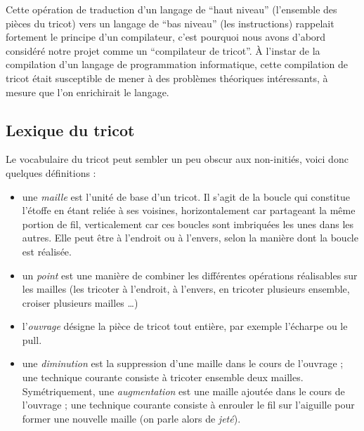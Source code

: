 \documentclass{article}
\begin{document}
Cette opération de traduction d'un langage de ``haut niveau'' (l'ensemble des pièces du tricot) vers un langage de ``bas niveau'' (les instructions) rappelait fortement le principe d'un compilateur, c'est pourquoi 
nous avons d'abord considéré notre projet comme un ``compilateur de tricot''. À l'instar de la compilation d'un langage de programmation informatique, cette 
compilation de tricot était susceptible de mener à des problèmes théoriques intéressants, à mesure que l'on enrichirait le langage.

\subsection*{Lexique du tricot} %


Le vocabulaire du tricot peut sembler un peu obscur aux non-initiés, voici donc quelques définitions :

\begin{itemize}
\item une \emph{maille} est l'unité de base d'un tricot. Il s'agit de la boucle qui constitue l'étoffe en étant reliée à ses voisines, horizontalement car 
  partageant la même portion de fil, verticalement car ces boucles sont imbriquées les unes dans les autres. Elle peut être à l'endroit ou à l'envers, selon la 
  manière dont la boucle est réalisée.
\item un \emph{point} est une manière de combiner les différentes opérations réalisables sur les mailles (les tricoter à l'endroit, à l'envers, en tricoter 
  plusieurs ensemble, croiser plusieurs mailles \dots)
\item l'\emph{ouvrage} désigne la pièce de tricot tout entière, par exemple l'écharpe ou le pull.
\item une \emph{diminution} est la suppression d'une maille dans le cours de l'ouvrage ; une technique courante consiste à tricoter ensemble 
  deux mailles. Symétriquement, une \emph{augmentation} est une maille ajoutée dans le cours de l'ouvrage ; une technique 
  courante consiste à enrouler le fil sur l'aiguille pour former une nouvelle maille (on parle alors de \emph{jeté}).
\end{itemize}
\end{document}
